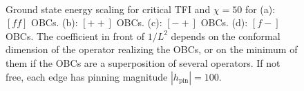 \begin{figure}[h!]
		\hspace{-0.9cm}
		\begin{minipage}{\linewidth}
			\
		\end{minipage}
		\caption{Ground state energy scaling for critical TFI and $\chi=50$ for (a): $[ff]$ OBCs. (b): $[++]$ OBCs. (c): $[-+]$ OBCs. (d): $[f-]$ OBCs. The coefficient in front of $1/L^2$ depends on the conformal dimension of the operator realizing the OBCs, or on the minimum of them if the OBCs are a superposition of several operators. If not free, each edge has pinning magnitude $|h_\text{pin}|=100$.}
		\label{fig:gsSalingTFI}
	\end{figure}

